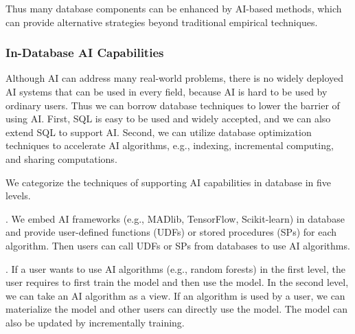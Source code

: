 Thus many database components can be enhanced by AI-based methods, which can provide alternative strategies beyond traditional empirical techniques. 



\subsubsection{In-Database AI Capabilities}
\label{subsubsec: engine}

Although AI can address many real-world problems, there is no widely deployed AI systems that can be used in every field, because AI is hard to be used by ordinary users. Thus we can borrow database techniques to lower the barrier of using AI.  First, SQL is easy to be used and widely accepted, and we can also extend SQL to support AI. Second, we can utilize database optimization techniques to accelerate AI algorithms, e.g., indexing, incremental computing, and sharing computations. 


We categorize the techniques of supporting AI capabilities in database in five levels. 


. We embed AI frameworks (e.g., MADlib, TensorFlow, Scikit-learn) in database and provide user-defined functions (UDFs) or stored procedures (SPs) for each algorithm. Then users can call UDFs or SPs from databases to use AI algorithms. 

. If a user wants to use AI algorithms (e.g., random forests) in the first level, the user requires to first train the model and then use the model. In the second level, we can take an AI algorithm as a view. If an algorithm is used by a user, we can materialize the model and other users can directly use the model. The model can also be updated by incrementally training. 


